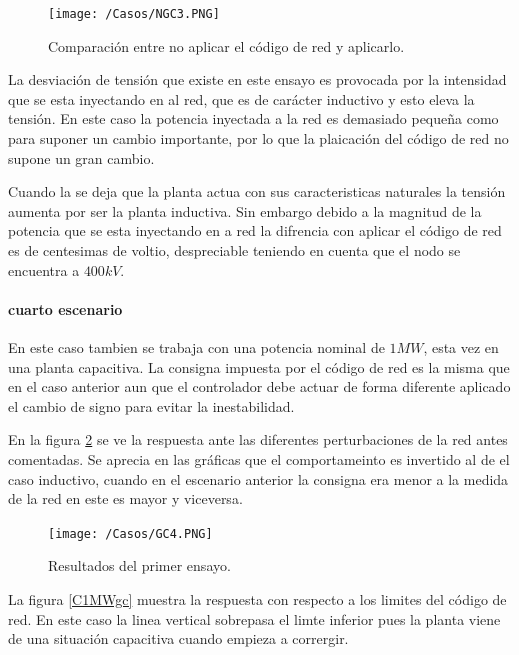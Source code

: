 \documentclass{book}
\begin{document}
\begin{figure}[h!]
\centering
\texttt{[image: /Casos/NGC3.PNG]}
\caption{Comparaci\'on entre no aplicar el c\'odigo de red y aplicarlo. }
\label{NGC3}
\end{figure} \par

La desviaci\'on de tensi\'on que existe en este ensayo es provocada por la intensidad que se esta inyectando en al red, que es de car\'acter inductivo y esto eleva la tensi\'on. En este caso la potencia inyectada a la red es demasiado pequeña como para suponer un cambio importante, por lo que la plaicaci\'on del c\'odigo de red no supone un gran cambio.  \par

Cuando la se deja que la planta actua con sus caracteristicas naturales la tensi\'on aumenta por ser la planta inductiva. Sin embargo debido a la magnitud de la potencia que se esta inyectando en a red la difrencia con aplicar el c\'odigo de red es de centesimas de voltio, despreciable teniendo en cuenta que el nodo se encuentra a $400kV$. \par



	\paragraph{cuarto escenario}

En este caso tambien se trabaja con una potencia nominal de $1MW$, esta vez en una planta capacitiva. La consigna impuesta por el c\'odigo de red es la misma que en el caso anterior aun que el controlador debe actuar de forma diferente aplicado el cambio de signo para evitar la inestabilidad. 

En la figura \ref{GC4} se ve la respuesta ante las diferentes perturbaciones de la red antes comentadas. Se aprecia en las gr\'aficas que el comportameinto es invertido al de el caso inductivo, cuando en el escenario anterior la consigna era menor a la medida de la red en este es mayor y viceversa. \par

\begin{figure}[h!]
\centering
\texttt{[image: /Casos/GC4.PNG]}
\caption{Resultados del primer ensayo. }
\label{GC4}
\end{figure} \par

La figura \ref{C1MWgc} muestra la respuesta con respecto a los limites del c\'odigo de red. En este caso la linea vertical sobrepasa el limte inferior pues la planta viene de una situaci\'on capacitiva cuando empieza a corrergir. \par
\end{document}
